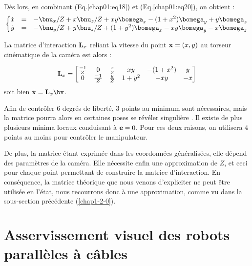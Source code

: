 D\`es lors, en combinant (Eq.\ref{chap01:eq18}) et (Eq.\ref{chap01:eq20}), on 
obtient :
\begin{equation}
\left \lbrace
\begin{matrix}
\dot x &=& -\bnu_x/Z +x\bnu_z/Z + xy\bomega_x -(1+x^2)\bomega_y + y \bomega_z \\
\dot y &=& -\bnu_y/Z +y\bnu_z/Z + (1+y^2)\bomega_x -xy\bomega_y - x \bomega_z
\end{matrix}
\right .
\label{chap01:eq22}
\end{equation}

La matrice d'interaction ${\bf L}_x$ reliant la vitesse du point ${\bf x} = 
(x,y)$ au torseur cin\'ematique de la cam\'era est alors :

\begin{equation}
{\bf L}_x =
\begin{bmatrix}
\frac {-1} Z & 0 & \frac x Z & xy & -(1+x^2) & y \\
0 & \frac {-1} Z & \frac y Z & 1+y^2 & -xy & -x
\end{bmatrix}
\label{chap01:eq23}
\end{equation}
soit bien $\dot {\bf x} = {\bf L}_x \bv$.

Afin de contr\^oler $6$ degr\'es de libert\'e, $3$ points au minimum sont 
n\'ecessaires, mais la matrice pourra alors en certaines poses se r\'ev\'eler 
singuli\`ere \cite{michel1993}. Il existe de plus plusieurs minima locaux 
conduisant \`a ${\bf e} = 0$. Pour ces deux raisons, on utilisera $4$ points au 
moins pour contr\^oler le manipulateur.

De plus, la matrice \'etant exprim\'ee dans les coordonn\'ees 
g\'en\'eralis\'ees, elle d\'epend des param\`etres de la cam\'era. Elle 
n\'ecessite enfin une approximation de $Z$, et ceci pour chaque point 
permettant de construire la matrice d'interaction. En cons\'equence, la matrice 
th\'eorique que nous venons d'expliciter ne peut \^etre utilis\'ee en l'\'etat, 
nous recourrons donc \`a une approximation, comme vu dans la sous-section 
pr\'ec\'edente (\ref{chap1-2-0}).

\section{Asservissement visuel des robots parallèles à 
câbles}\label{chap1-3}

